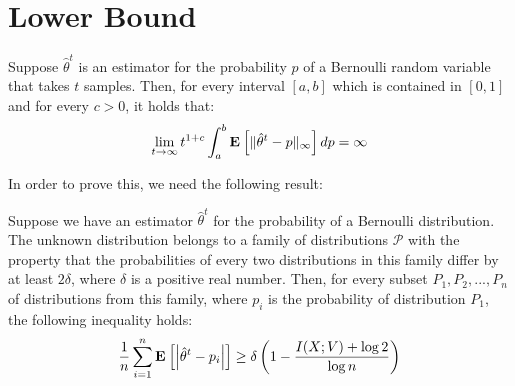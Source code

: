 \section{Lower Bound}
\begin{theorem}\label{t:lower_bound}
Suppose $\hat{\theta}^t$ is an estimator for the probability $p$ of a Bernoulli random variable that takes $t$ samples. Then, for every interval $[a,b]$ which is contained in $[0,1]$ and for every $c>0$, it holds that:
$$ \lim_{t\to\infty} t^{1+c}\int_{a}^b \Exp{\norm{\infty}{\hat{\theta}^t-p}}dp = \infty$$
\end{theorem}
In order to prove this, we need the following result:
\begin{lemma}\label{l:fano}
Suppose we have an estimator $\hat{\theta}^t$ for the probability of a Bernoulli distribution. 
The unknown distribution belongs to a family of distributions $\mathcal{P}$ with the property that the probabilities of every two distributions in this family differ by at least $2\delta$, where $\delta$ is a positive real number.
Then, for every subset ${P_1, P_2, ..., P_n}$ of distributions from this family, where $p_i$ is the probability of distribution $P_1$, the following inequality holds:
$$\frac{1}{n} \sum_{i=1}^n \Exp{\lp|\hat{\theta}^t-p_i\rp|} \geq \delta \lp(1-\frac{I(X;V)+\log 2}{\log n}\rp)$$
\end{lemma}

